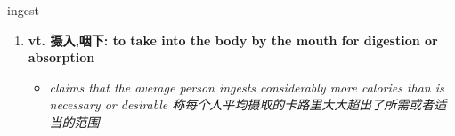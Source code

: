 
\begin{frame}
{\huge ingest}
\begin{center}
\begin{enumerate}\Large
  \item \textbf{vt. 摄入,咽下: to take into the body by the mouth for digestion or absorption}
  \begin{itemize}
    \item \em{\Large{claims that the average person ingests considerably more calories than is necessary or desirable 称每个人平均摄取的卡路里大大超出了所需或者适当的范围}}
  \end{itemize}
\end{enumerate}
\end{center}
\end{frame}
